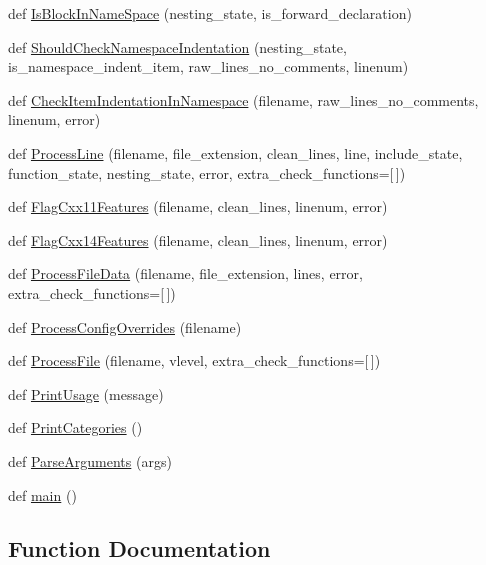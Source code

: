 \begin{DoxyCompactItemize}
\item 
def \hyperlink{namespacecpplint_a618e046738f246f01972bce339ee5d49}{Is\+Block\+In\+Name\+Space} (nesting\+\_\+state, is\+\_\+forward\+\_\+declaration)
\item 
def \hyperlink{namespacecpplint_aaaeb792789007d86b0898676c00caa72}{Should\+Check\+Namespace\+Indentation} (nesting\+\_\+state, is\+\_\+namespace\+\_\+indent\+\_\+item, raw\+\_\+lines\+\_\+no\+\_\+comments, linenum)
\item 
def \hyperlink{namespacecpplint_ac8e3b4340d0d83c8b2e7b199597b29a0}{Check\+Item\+Indentation\+In\+Namespace} (filename, raw\+\_\+lines\+\_\+no\+\_\+comments, linenum, error)
\item 
def \hyperlink{namespacecpplint_ac7c198c2adf60fd79a3f2b4270055a3b}{Process\+Line} (filename, file\+\_\+extension, clean\+\_\+lines, line, include\+\_\+state, function\+\_\+state, nesting\+\_\+state, error, extra\+\_\+check\+\_\+functions=\mbox{[}$\,$\mbox{]})
\item 
def \hyperlink{namespacecpplint_a386f43855367cc82348b0e2834e5cdc0}{Flag\+Cxx11\+Features} (filename, clean\+\_\+lines, linenum, error)
\item 
def \hyperlink{namespacecpplint_a744a4eecd461be0235779b03d34d6daf}{Flag\+Cxx14\+Features} (filename, clean\+\_\+lines, linenum, error)
\item 
def \hyperlink{namespacecpplint_ace3e46f0fab9638ad0e786037a5ca96c}{Process\+File\+Data} (filename, file\+\_\+extension, lines, error, extra\+\_\+check\+\_\+functions=\mbox{[}$\,$\mbox{]})
\item 
def \hyperlink{namespacecpplint_a6b67f01b8b199f5f6a7481fc0fb53878}{Process\+Config\+Overrides} (filename)
\item 
def \hyperlink{namespacecpplint_a41785091b61e8719f4a4a886eb20fe43}{Process\+File} (filename, vlevel, extra\+\_\+check\+\_\+functions=\mbox{[}$\,$\mbox{]})
\item 
def \hyperlink{namespacecpplint_a57542503fc1cce3e5c7171fc32d6ba05}{Print\+Usage} (message)
\item 
def \hyperlink{namespacecpplint_a3b1a047aa772a0d7d049d29c8ee62aba}{Print\+Categories} ()
\item 
def \hyperlink{namespacecpplint_a57476f6a7321d342db7b7ca98d80bd27}{Parse\+Arguments} (args)
\item 
def \hyperlink{namespacecpplint_a03dd39c6bfb4337676fcfaf5cd797c91}{main} ()
\end{DoxyCompactItemize}


\subsection{Function Documentation}
